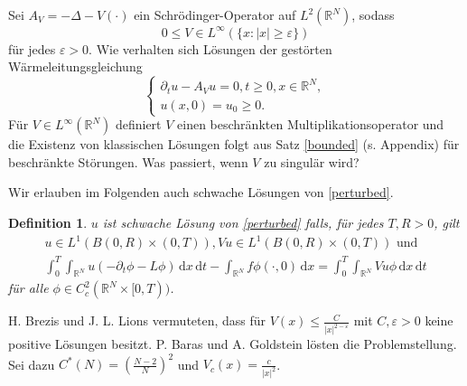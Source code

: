 \documentclass[11pt,twoside,a4paper]{article}
\newtheorem{df}[thm]{Definition}
\theoremstyle{break}
\begin{document}
Sei $A_V= -\Delta - V(\cdot)$ ein Schr\"odinger-Operator auf $L^2(\mathbb R^N)$, sodass
\begin{equation}
0\le V\in L^\infty(\{x:|x|\ge \varepsilon\})
\end{equation}\label{perturbed}
f\"ur jedes $\varepsilon>0$. Wie verhalten sich L\"osungen der gest\"orten W\"armeleitungsgleichung 
\begin{equation}\label{perturbed}
\begin{cases}
\partial_t u - A_V u =0, t\ge 0, x\in \mathbb R^N,\\
u(x,0)=u_0 \ge 0.
\end{cases}
\end{equation}
F\"ur $V\in L^\infty(\mathbb R^N)$ definiert $V$ einen beschr\"ankten Multiplikationsoperator und die Existenz von klassischen L\"osungen folgt aus Satz \ref{bounded} (s. Appendix) f\"ur beschr\"ankte St\"orungen. %
Was passiert, wenn $V$ zu singul\"ar wird?

Wir erlauben im Folgenden auch schwache L\"osungen von \eqref{perturbed}. \vspace{.25cm}
\begin{df}
$u$ ist schwache L\"osung von \eqref{perturbed} falls, f\"ur jedes $T, R>0$, gilt
\begin{gather}\label{weak}
u\in L^1(B(0,R) \times (0,T)), Vu \in L^1(B(0,R)\times (0,T)) \text{ und }\\
\int_0^T \int_{\mathbb R^N} u (-\partial_t \phi - L\phi) \, \mathrm dx \, \mathrm dt - \int_{\mathbb R^N} f \phi(\cdot, 0) \, \mathrm dx = \int_0^T \int_{\mathbb R^N} V u \phi \, \mathrm dx \, \mathrm dt
\end{gather}
f\"ur alle $\phi \in C_c^2(\mathbb R^N\times [0,T))$.
\end{df}

H. Brezis und J. L. Lions vermuteten, dass f\"ur $V(x) \le \frac{C}{|x|^{2-\varepsilon}}$ mit $C, \varepsilon>0$ keine positive L\"osungen besitzt. P. Baras und A. Goldstein l\"osten die Problemstellung.  Sei dazu $C^*(N)=( \tfrac{N-2}{N} )^2$ und $V_c(x) = \frac{c}{|x|^2}$. \vspace{.25cm}
\end{document}
